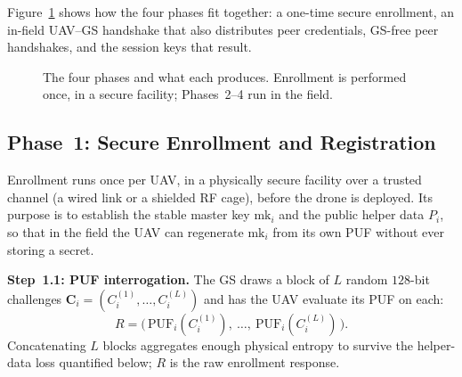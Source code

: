 \documentclass[11pt,a4paper]{article}
\begin{document}
Figure~\ref{fig:overview} shows how the four phases fit together: a one-time
secure enrollment, an in-field UAV--GS handshake that also distributes peer
credentials, GS-free peer handshakes, and the session keys that result.

\begin{figure}[H]
\centering
{}
\caption{The four phases and what each produces. Enrollment is performed once,
in a secure facility; Phases~2--4 run in the field.}
\label{fig:overview}
\end{figure}

\subsection{Phase~1: Secure Enrollment and Registration}
\label{subsec:phase1}

Enrollment runs once per UAV, in a physically secure facility over a trusted
channel (a wired link or a shielded RF cage), before the drone is deployed. Its
purpose is to establish the stable master key $\text{mk}_i$ and the public
helper data $P_i$, so that in the field the UAV can regenerate $\text{mk}_i$
from its own PUF without ever storing a secret.

\textbf{Step~1.1: PUF interrogation.}
The GS draws a block of $L$ random $128$-bit challenges
$\bm{C}_i=(C_i^{(1)},\dots,C_i^{(L)})$ and has the UAV evaluate its PUF on each:
\begin{equation}
R = \big(\,\text{PUF}_i(C_i^{(1)}),\ \dots,\ \text{PUF}_i(C_i^{(L)})\,\big).
\end{equation}
Concatenating $L$ blocks aggregates enough physical entropy to survive the
helper-data loss quantified below; $R$ is the raw enrollment response.
\end{document}
